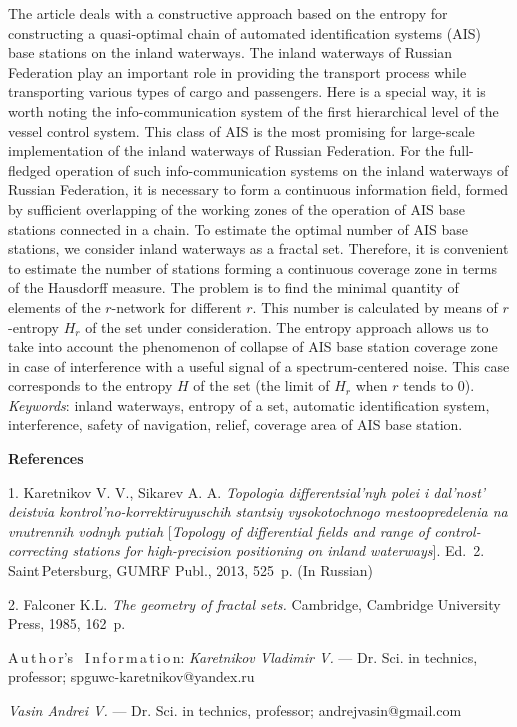 {{\leftskip=7mm\noindent The article deals with a constructive
approach based on the entropy for constructing a quasi-optimal
chain of automated identification systems (AIS) base stations on
the inland waterways. The inland waterways of Russian Federation
play an important role in providing the transport process while
transporting various types of cargo and passengers. Here is a
special way, it is worth noting the info-communication system of
the first hierarchical level of the vessel control system. This
class of AIS is the most promising for large-scale implementation
of the inland waterways of Russian Federation. For the
full-fledged operation of such info-communication systems on the
inland waterways of Russian Federation, it is necessary to form a
continuous information field, formed by sufficient overlapping of
the working zones of the operation of  AIS base stations connected
in a chain. To estimate the optimal number of AIS base stations,
we consider inland waterways as a fractal set. Therefore, it is
convenient to estimate the number of stations forming a continuous
coverage zone in terms of the Hausdorff measure. The problem is to
find the minimal  quantity  of elements of the $r$-network for
different $r$. This number is calculated by means of $r$-entropy
$H_r$ of the set under consideration. The entropy approach allows
us to take into account the phenomenon of collapse of AIS base
station coverage zone in case of interference with a useful signal
of a spectrum-centered noise. This case corresponds to the entropy
$H$
of the set (the limit of  $H_r$ when $r$ tends to 0).\\[1mm]
\textit{Keywords}: inland waterways, entropy of a set, automatic
identification system, interference, safety of navigation, relief,
coverage area of AIS base station.
\par}

\vskip5mm

\noindent \textbf{References} }

\vskip 2mm

{\footnotesize


1. Karetnikov V. V., Sikarev A. A. \textit{Topologia
differentsial'nyh polei i dal'nost' deistvia
kontrol'no-korrektiruyuschih stantsiy vysokotochnogo
mestoopredelenia na vnutrennih vodnyh putiah} [\textit{Topology of
differential fields and range of control-correcting stations for
high-precision positioning on inland waterways}]. Ed.~2.
Saint\,Petersburg, GUMRF Publ., 2013, 525~p. (In Russian)

2. Falconer K.L. \textit{The geometry of fractal sets.} Cambridge,
Cambridge University Press, 1985, 162~p.



\vskip5mm A\,u\,t\,h\,o\,r's \ I\,n\,f\,o\,r\,m\,a\,t\,i\,o\,n:
\vskip1.5mm \textit{Karetnikov Vladimir V.} --- Dr. Sci. in
technics, professor; spguwc-karetnikov@yandex.ru

\textit{Vasin Andrei V.} --- Dr. Sci. in technics,  professor;
andrejvasin@gmail.com




}
